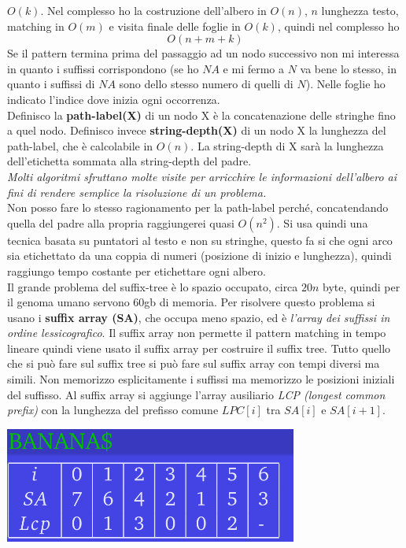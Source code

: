 \documentclass[a4paper,12pt, oneside]{book}
\begin{document}
$O(k)$. Nel complesso ho la costruzione dell'albero in $O(n)$, $n$
lunghezza testo, matching in $O(m)$ e visita finale delle foglie in
$O(k)$, quindi nel complesso ho
\[O(n+m+k)\]
Se il pattern termina prima del passaggio ad un nodo successivo non mi
interessa in quanto i suffissi corrispondono (se ho $NA$ e mi fermo a
$N$ va bene lo stesso, in quanto i suffissi di $NA$ sono dello stesso
numero di quelli di $N$). Nelle foglie ho indicato l'indice dove
inizia ogni occorrenza.\\
Definisco la \textbf{path-label(X)} di un nodo X è la concatenazione delle
stringhe fino a quel nodo. Definisco invece \textbf{string-depth(X)} di
un nodo X la lunghezza del path-label, che è calcolabile in $O(n)$. La
string-depth di X sarà la lunghezza dell'etichetta sommata alla
string-depth del padre.\\
\textit{Molti algoritmi sfruttano molte visite per arricchire le
  informazioni dell'albero ai fini di rendere semplice la risoluzione
  di un problema.}\\
Non posso fare lo stesso ragionamento per la path-label perché,
concatendando quella del padre alla propria raggiungerei quasi
$O(n^2)$. Si usa quindi una tecnica basata su puntatori al testo e non
su stringhe, questo fa si che ogni arco sia etichettato da una coppia
di numeri (posizione di inizio e lunghezza), quindi raggiungo tempo
costante per etichettare ogni albero.\\
Il grande problema del suffix-tree è lo spazio occupato, circa $20n$
byte, quindi per il genoma umano servono 60gb di memoria. Per
risolvere questo problema si usano i \textbf{suffix array (SA)}, che occupa
meno spazio, ed è \textit{l'array dei suffissi in ordine
  lessicografico}. Il suffix array non permette il pattern matching in
tempo lineare quindi viene usato il suffix array per costruire il
suffix tree. Tutto quello che si può fare sul suffix tree si può fare
sul suffix array con tempi diversi ma simili. Non memorizzo
esplicitamente i suffissi ma memorizzo le posizioni iniziali del
suffisso. Al suffix array si aggiunge l'array ausiliario \textit{LCP
  (longest  common prefix)} con la lunghezza del prefisso comune $LPC[i]$
tra $SA[i]$ e $SA[i+1]$.
\begin{center}
  \includegraphics[scale = 0.5]{img/suf2.png}
\end{center}
\end{document}
